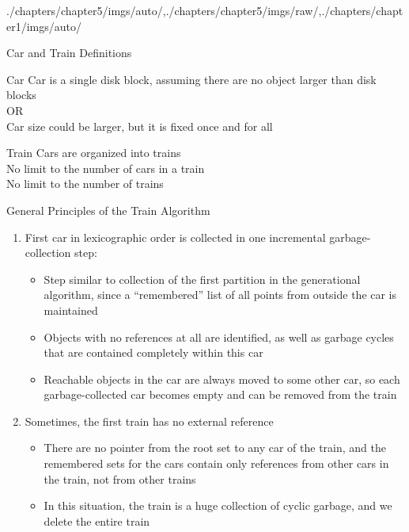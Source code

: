 \begin{graphicspathcontext}{{./chapters/chapter5/imgs/auto/},{./chapters/chapter5/imgs/raw/},{./chapters/chapter1/imgs/auto/}}
\begin{bibunit}[apalike]
\begin{frame}{Car and Train Definitions}
	\vspace{.5cm}
	\begin{definitionblock}{Car}
		Car is a single disk block, assuming there are no object larger than disk blocks \\
		OR \\
		Car size could be larger, but it is fixed once and for all
	\end{definitionblock}
	\vspace{.5cm}
	\begin{definitionblock}{Train}
			Cars are organized into trains \\[.2cm]
			No limit to the number of cars in a train \\
			No limit to the number of trains
	\end{definitionblock}
\end{frame}

\begin{frame}{{General Principles} of the Train Algorithm}
	\vspace{.25cm}
	\begin{enumerate}
		\item<1> First car in lexicographic order is collected in one incremental garbage-collection step: \begin{itemize}
			\item Step similar to collection of the first partition in the generational algorithm, since a ``remembered'' list of all points from outside the car is maintained
			\item Objects with no references at all are identified, as well as garbage cycles that are contained completely within this car
			\item Reachable objects in the car are always moved to some other car, so each garbage-collected car becomes empty and can be removed from the train
		\end{itemize}
		\item<2> Sometimes, the first train has no external reference \begin{itemize}
			\item There are no pointer from the root set to any car of the train, and the remembered sets for the cars contain only references from other cars in the train, not from other trains
			\item In this situation, the train is a huge collection of cyclic garbage, and we delete the entire train
		\end{itemize}
	\end{enumerate}
\end{frame}


\end{bibunit}
\end{graphicspathcontext}
